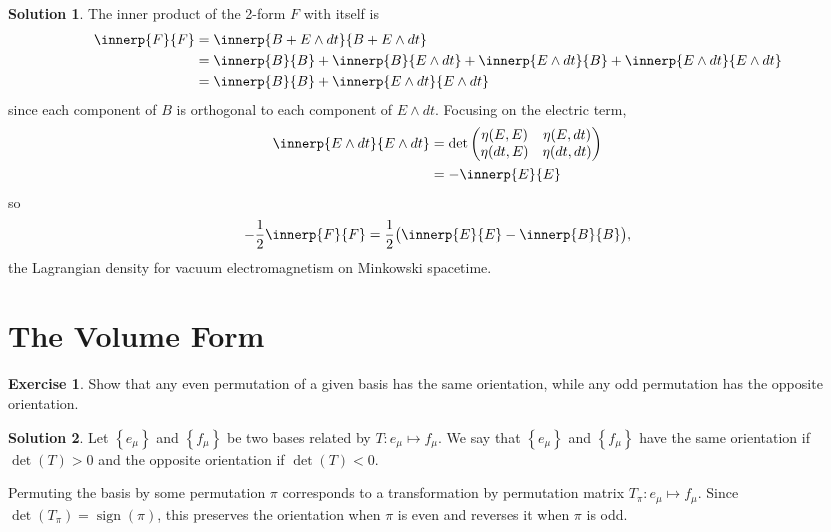\documentclass[11pt, a4paper]{report}
\theoremstyle{definition}
\newtheorem{exercise}{Exercise}[part]
\newtheorem{solution}{Solution}[part]
\newenvironment{ex}{\begin{exercise}}{\end{exercise}\pagebreak[1]}
\newenvironment{sol}{\begin{solution}}{\end{solution}\pagebreak[3]}
\DeclareMathOperator{\sign}{sign}
\begin{document}
\begin{sol}

The inner product of the 2-form $F$ with itself is
\begin{align*}
    \innerp{F}{F} &= \innerp{B + E \wedge dt}{B + E \wedge dt} \\
        &= \innerp{B}{B} + \innerp{B}{E \wedge dt} + \innerp{E \wedge dt}{B} + \innerp{E \wedge dt}{E \wedge dt} \\
        &= \innerp{B}{B} + \innerp{E \wedge dt}{E \wedge dt}
\end{align*}
since each component of $B$ is orthogonal to each component of $E \wedge dt$.
Focusing on the electric term,
\begin{align*}
    \innerp{E \wedge dt}{E \wedge dt} &= \det \begin{pmatrix}
                \eta(E, E) & \eta(E, dt) \\
                \eta(dt, E) & \eta(dt, dt)
            \end{pmatrix} \\
        &= -\innerp{E}{E}
\end{align*}
so
\[
    -\frac{1}{2} \innerp{F}{F} = \frac{1}{2} \bigl( \innerp{E}{E} - \innerp{B}{B} \bigr),
\]
the Lagrangian density for vacuum electromagnetism on Minkowski spacetime.

\end{sol}

\section{The Volume Form}

\begin{ex}

Show that any even permutation of a given basis has the same orientation, while any odd permutation has the opposite orientation.

\end{ex}

\begin{sol}

Let $\left\{e_\mu\right\}$ and $\left\{f_\mu\right\}$ be two bases related by $T: e_\mu \mapsto f_\mu$. We say that $\left\{e_\mu\right\}$ and $\left\{f_\mu\right\}$ have the same orientation if $\det(T) > 0$ and the opposite orientation if $\det(T) < 0$.

Permuting the basis by some permutation $\pi$ corresponds to a transformation by permutation matrix $T_\pi: e_\mu \mapsto f_\mu$. Since $\det(T_\pi) = \sign(\pi)$, this preserves the orientation when $\pi$ is even and reverses it when $\pi$ is odd.

\end{sol}
\end{document}
